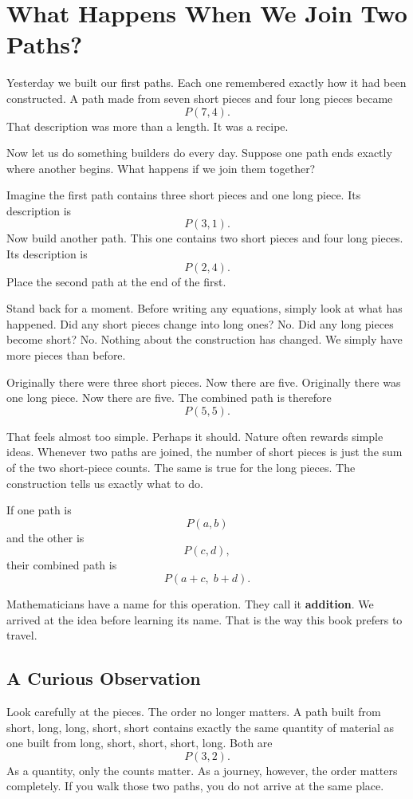 \chapter{What Happens When We Join Two Paths?}
\label{stone:adding}

Yesterday we built our first paths. Each one remembered exactly how it had been constructed. A path made from seven short pieces and four long pieces became
\[
P(7,4).
\]
That description was more than a length. It was a recipe.

Now let us do something builders do every day. Suppose one path ends exactly where another begins. What happens if we join them together?

Imagine the first path contains three short pieces and one long piece. Its description is
\[
P(3,1).
\]
Now build another path. This one contains two short pieces and four long pieces. Its description is
\[
P(2,4).
\]
Place the second path at the end of the first.

Stand back for a moment. Before writing any equations, simply look at what has happened. Did any short pieces change into long ones? No. Did any long pieces become short? No. Nothing about the construction has changed. We simply have more pieces than before.

Originally there were three short pieces. Now there are five. Originally there was one long piece. Now there are five. The combined path is therefore
\[
P(5,5).
\]

That feels almost too simple. Perhaps it should. Nature often rewards simple ideas. Whenever two paths are joined, the number of short pieces is just the sum of the two short-piece counts. The same is true for the long pieces. The construction tells us exactly what to do.

If one path is
\[
P(a,b)
\]
and the other is
\[
P(c,d),
\]
their combined path is
\[
P(a+c,\;b+d).
\]

Mathematicians have a name for this operation. They call it \textbf{addition}. We arrived at the idea before learning its name. That is the way this book prefers to travel.

\section*{A Curious Observation}

Look carefully at the pieces. The order no longer matters. A path built from short, long, long, short, short contains exactly the same quantity of material as one built from long, short, short, short, long. Both are
\[
P(3,2).
\]
As a quantity, only the counts matter. As a journey, however, the order matters completely. If you walk those two paths, you do not arrive at the same place.

